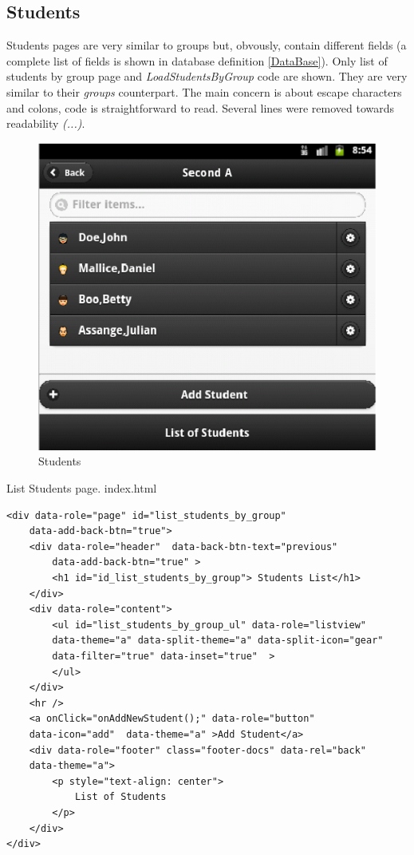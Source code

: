 \newpage
\subsection{Students}    

Students pages are very similar to groups but, obvously, contain different fields (a complete list of fields is shown in database
definition \ref{DataBase}). Only list of students by group page and \textit{LoadStudentsByGroup} code are shown. 
They are very similar to their \textit{groups} counterpart. The main concern is about escape characters and colons,
code is straightforward to read. Several lines were removed towards readability \textit{(...)}. 

\begin{figure}
    \begin{center}
        \includegraphics{eduxes_list_students.eps}
        \caption{Students}
        \label{fig:EduXesStudents}
    \end{center}
\end{figure}


\begin{bclogo}[couleur=blue!30,arrondi=0.1,ombre=true ] 
{List Students page. index.html \label{list_students_page}}
\begin{verbatim}
<div data-role="page" id="list_students_by_group" 
    data-add-back-btn="true">
    <div data-role="header"  data-back-btn-text="previous" 
        data-add-back-btn="true" >
        <h1 id="id_list_students_by_group"> Students List</h1>
    </div>
    <div data-role="content">
        <ul id="list_students_by_group_ul" data-role="listview" 
        data-theme="a" data-split-theme="a" data-split-icon="gear" 
        data-filter="true" data-inset="true"  >
        </ul>
    </div>
    <hr />
    <a onClick="onAddNewStudent();" data-role="button" 
    data-icon="add"  data-theme="a" >Add Student</a>
    <div data-role="footer" class="footer-docs" data-rel="back" 
    data-theme="a">
        <p style="text-align: center">
            List of Students
        </p>
    </div>
</div>
\end{verbatim}
\end{bclogo}


